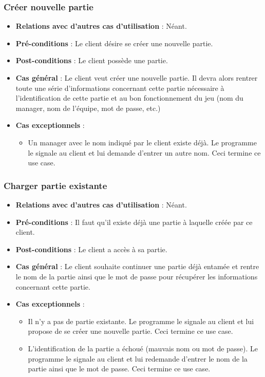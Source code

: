 \documentclass[a4paper,titlepage]{scrreprt}
\begin{document}
    \subsubsection{Créer nouvelle partie}
      \begin{itemize}
        \item \textbf{Relations avec d'autres cas d'utilisation}  : Néant.
        \item \textbf{Pré-conditions} : Le client désire se créer une nouvelle partie.
        \item \textbf{Post-conditions} : Le client possède une partie.
        \item \textbf{Cas général} : Le client veut créer une nouvelle partie. Il devra alors rentrer toute une série d’informations concernant cette partie nécessaire à l’identification de cette partie et au bon fonctionnement du jeu (nom du manager, nom de l’équipe, mot de passe, etc.)
        \item \textbf{Cas exceptionnels} :
          \begin{itemize}
            \item Un manager avec le nom indiqué par le client existe déjà. Le programme le signale au client et lui demande d'entrer un autre nom. Ceci termine ce use case.
          \end{itemize}
      \end{itemize}
    \subsubsection{Charger partie existante}
      \begin{itemize}
        \item \textbf{Relations avec d'autres cas d'utilisation}  : Néant.
        \item \textbf{Pré-conditions} : Il faut qu’il existe déjà une partie à laquelle créée par ce client.
        \item \textbf{Post-conditions} : Le client a accès à sa partie.
        \item \textbf{Cas général} : Le client souhaite continuer une partie déjà entamée et rentre le nom de la partie ainsi que le mot de passe pour récupérer les informations concernant cette partie.
        \item \textbf{Cas exceptionnels} :
          \begin{itemize}
            \item Il n’y a pas de partie existante. Le programme le signale au client et lui propose de se créer une nouvelle partie. Ceci termine ce use case.
			\item L’identification de la partie a échoué (mauvais nom ou mot de passe). Le programme le signale au client et lui redemande d'entrer le nom de la partie ainsi que le mot de passe. Ceci termine ce use case.
          \end{itemize}
      \end{itemize}
\end{document}

